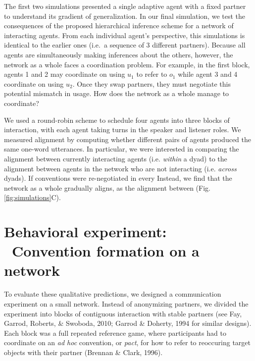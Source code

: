 \documentclass[10pt, letterpaper]{article}
\begin{document}
The first two simulations presented a single adaptive agent with a fixed
partner to understand its gradient of generalization. In our final
simulation, we test the consequences of the proposed hierarchical
inference scheme for a network of interacting agents. From each
individual agent's perspective, this simulations is identical to the
earlier ones (i.e.~a sequence of 3 different partners). Because all
agents are simultaneously making inferences about the others, however,
the network as a whole faces a coordination problem. For example, in the
first block, agents 1 and 2 may coordinate on using \(u_1\) to refer to
\(o_1\) while agent 3 and 4 coordinate on using \(u_2\). Once they swap
partners, they must negotiate this potential mismatch in usage. How does
the network as a whole manage to coordinate?

We used a round-robin scheme to schedule four agents into three blocks
of interaction, with each agent taking turns in the speaker and listener
roles. We measured alignment by computing whether different pairs of
agents produced the same one-word utterances. In particular, we were
interested in comparing the alignment between currently interacting
agents (i.e. \emph{within} a dyad) to the alignment between agents in
the network who are not interacting (i.e. \emph{across} dyads). If
conventions were re-negotiated in every Instead, we find that the
network as a whole gradually aligns, as the alignment between (Fig.
\ref{fig:simulations}C).

\hypertarget{behavioral-experiment-convention-formation-on-a-network}{%
\section{Behavioral experiment: ~Convention formation on a
network}\label{behavioral-experiment-convention-formation-on-a-network}}

To evaluate these qualitative predictions, we designed a communication
experiment on a small network. Instead of anonymizing partners, we
divided the experiment into blocks of contiguous interaction with stable
partners (see Fay, Garrod, Roberts, \& Swoboda, 2010; Garrod \& Doherty,
1994 for similar designs). Each block was a full repeated reference
game, where participants had to coordinate on an \emph{ad hoc}
convention, or \emph{pact}, for how to refer to reoccuring target
objects with their partner (Brennan \& Clark, 1996).
\end{document}
